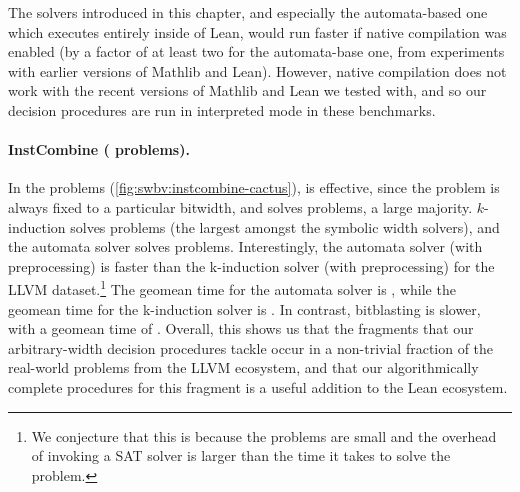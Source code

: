 The solvers introduced in this chapter, and especially the automata-based one
which executes entirely inside of Lean, would run faster if native compilation
was enabled (by a factor of at least two for the automata-base one, from
experiments with earlier versions of Mathlib and Lean). However, native
compilation does not work with the recent versions of Mathlib and Lean we tested
with, and so our decision procedures are run in interpreted mode in these
benchmarks.

\paragraph{InstCombine (\InstCombineTotalProblems{} problems).} In the \InstCombineTotalProblems{} problems (\cref{fig:swbv:instcombine-cactus}),
\bvdecide{} is effective, since the problem is always fixed to a particular bitwidth,
and solves \InstCombineBvDecideNumSolved{} problems, a large majority.
$k$-induction solves \InstCombineNormCircuitVerifiedNumSolved{} problems (the largest amongst the symbolic width solvers),
and the automata solver solves \InstCombineNormPresburgerNumSolved{} problems.
Interestingly, the automata solver (with preprocessing) is faster than the k-induction solver (with preprocessing) for the LLVM dataset.\footnote{We conjecture that this is because the problems are small and the overhead of invoking a SAT solver is larger than the time it takes to solve the problem.}
The geomean time for the automata solver is \InstCombineNormPresburgerGeoMean{}, while the geomean time for the k-induction solver is \InstCombineNormCircuitVerifiedGeoMean{}. In contrast, bitblasting is slower, with a geomean time of \InstCombineBvDecideGeoMean{}.
Overall, this shows us that the fragments that our arbitrary-width decision procedures tackle occur in a non-trivial fraction of the real-world problems from the LLVM ecosystem,
and that our algorithmically complete procedures for this fragment is a useful addition to the Lean ecosystem.


